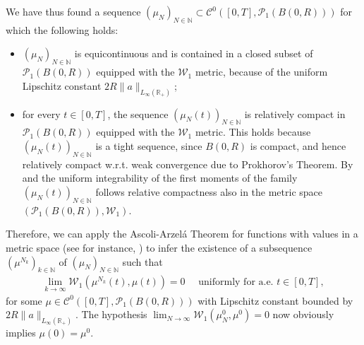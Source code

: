\documentclass[A4paper,11pt]{article}
\theoremstyle{definition}
\newcommand{\N}{\mathbb{N}}
\newcommand{\R}{\mathbb{R}}
\newcommand{\W}{\mathcal{W}}
\begin{document}
We have thus found a sequence $(\mu_N)_{N \in \N} \subset \mathcal{C}^0([0,T],\mathcal{P}_1(B(0,R)))$ for which the following holds:
\begin{itemize}
\item $(\mu_N)_{N \in \N}$ is equicontinuous and is contained in a closed subset of $\mathcal{P}_1(B(0,R))$ equipped with the $\W_1$ metric, because of the uniform Lipschitz constant $2R\|a\|_{L_{\infty}(\R_+)}$;
\item for every $t \in [0,T]$, the sequence $(\mu_N(t))_{N \in \N}$ is relatively compact in $\mathcal{P}_1(B(0,R))$ equipped with the $\W_1$ metric. This holds because $(\mu_N(t))_{N \in \N}$ is a tight sequence, since $B(0,R)$ is compact, and hence relatively compact w.r.t. weak convergence due to Prokhorov's Theorem. By \cite[Proposition 7.1.5]{AGS} and the uniform integrability of the first moments of the family $(\mu_N(t))_{N \in \N}$ follows relative compactness also in the metric space $(\mathcal{P}_1(B(0,R)),\W_1)$.
\end{itemize}
Therefore, we can apply the Ascoli-Arzel\'{a} Theorem for functions with values in a metric space (see for instance, \cite[Chapter 7, Theorem 18]{KelleyTop}) to infer the existence of a subsequence $(\mu^{N_k})_{k \in \N}$ of $(\mu_N)_{N \in \N}$ such that
\begin{align}\label{eq:unifconv}
\lim_{k \rightarrow \infty}\W_1(\mu^{N_k}(t),\mu(t)) = 0 \quad \text{ uniformly for a.e. } t \in [0,T],
\end{align}
for some $\mu \in \mathcal{C}^0([0,T],\mathcal{P}_1(B(0,R)))$ with Lipschitz constant bounded by $2R\|a\|_{L_{\infty}(\R_+)}$. The hypothesis $\lim_{N\rightarrow\infty}\W_1(\mu_N^0,\mu^0) = 0$ now obviously implies $\mu(0) = \mu^0$.
\end{document}

